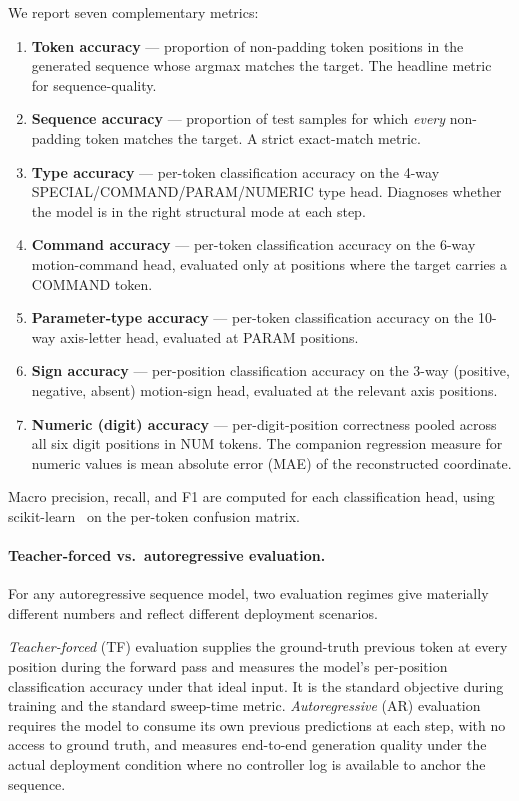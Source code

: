 \documentclass[sensors,article,submit,moreauthors,pdftex]{Definitions/mdpi}
\begin{document}
We report seven complementary metrics:

\begin{enumerate}
\item \textbf{Token accuracy} --- proportion of non-padding token positions in the generated sequence whose argmax matches the target. The headline metric for sequence-quality.
\item \textbf{Sequence accuracy} --- proportion of test samples for which \emph{every} non-padding token matches the target. A strict exact-match metric.
\item \textbf{Type accuracy} --- per-token classification accuracy on the 4-way SPECIAL/COMMAND/PARAM/NUMERIC type head. Diagnoses whether the model is in the right structural mode at each step.
\item \textbf{Command accuracy} --- per-token classification accuracy on the 6-way motion-command head, evaluated only at positions where the target carries a COMMAND token.
\item \textbf{Parameter-type accuracy} --- per-token classification accuracy on the 10-way axis-letter head, evaluated at PARAM positions.
\item \textbf{Sign accuracy} --- per-position classification accuracy on the 3-way (positive, negative, absent) motion-sign head, evaluated at the relevant axis positions.
\item \textbf{Numeric (digit) accuracy} --- per-digit-position correctness pooled across all six digit positions in NUM tokens. The companion regression measure for numeric values is mean absolute error (MAE) of the reconstructed coordinate.
\end{enumerate}

Macro precision, recall, and F1 are computed for each classification head, using scikit-learn~\cite{pedregosa2011sklearn} on the per-token confusion matrix.

\paragraph{Teacher-forced vs.\ autoregressive evaluation.} For any autoregressive sequence model, two evaluation regimes give materially different numbers and reflect different deployment scenarios.

\emph{Teacher-forced} (TF) evaluation supplies the ground-truth previous token at every position during the forward pass and measures the model's per-position classification accuracy under that ideal input. It is the standard objective during training and the standard sweep-time metric. \emph{Autoregressive} (AR) evaluation requires the model to consume its own previous predictions at each step, with no access to ground truth, and measures end-to-end generation quality under the actual deployment condition where no controller log is available to anchor the sequence.
\end{document}
